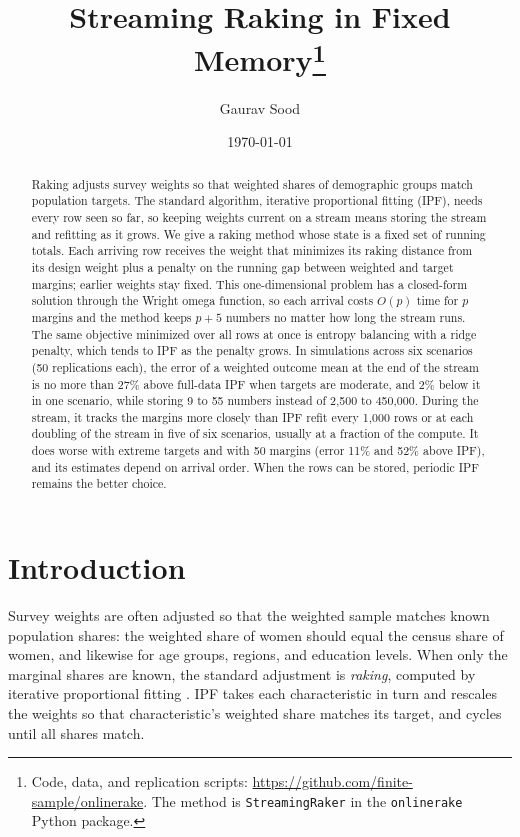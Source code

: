 \documentclass[12pt, letterpaper]{article}
\title{Streaming Raking in Fixed Memory\thanks{Code, data, and replication scripts: \href{https://github.com/finite-sample/onlinerake}{https://github.com/finite-sample/onlinerake}. The method is \texttt{StreamingRaker} in the \texttt{onlinerake} Python package.}}
\author{Gaurav Sood\vspace{.5cm}}
\date{\today}
\begin{document}
\maketitle

\begin{abstract}
Raking adjusts survey weights so that weighted shares of demographic groups match population targets. The standard algorithm, iterative proportional fitting (IPF), needs every row seen so far, so keeping weights current on a stream means storing the stream and refitting as it grows. We give a raking method whose state is a fixed set of running totals. Each arriving row receives the weight that minimizes its raking distance from its design weight plus a penalty on the running gap between weighted and target margins; earlier weights stay fixed. This one-dimensional problem has a closed-form solution through the Wright omega function, so each arrival costs $O(p)$ time for $p$ margins and the method keeps $p+5$ numbers no matter how long the stream runs. The same objective minimized over all rows at once is entropy balancing with a ridge penalty, which tends to IPF as the penalty grows. In simulations across six scenarios (50 replications each), the error of a weighted outcome mean at the end of the stream is no more than 27\% above full-data IPF when targets are moderate, and 2\% below it in one scenario, while storing 9 to 55 numbers instead of 2,500 to 450,000. During the stream, it tracks the margins more closely than IPF refit every 1,000 rows or at each doubling of the stream in five of six scenarios, usually at a fraction of the compute. It does worse with extreme targets and with 50 margins (error 11\% and 52\% above IPF), and its estimates depend on arrival order. When the rows can be stored, periodic IPF remains the better choice.
\end{abstract}

\section{Introduction}

Survey weights are often adjusted so that the weighted sample matches known population shares: the weighted share of women should equal the census share of women, and likewise for age groups, regions, and education levels. When only the marginal shares are known, the standard adjustment is \emph{raking}, computed by iterative proportional fitting \citep[IPF;][]{Deming1940}. IPF takes each characteristic in turn and rescales the weights so that characteristic's weighted share matches its target, and cycles until all shares match.
\end{document}
